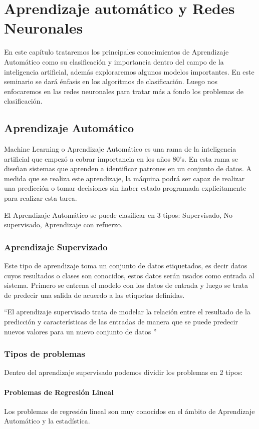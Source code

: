 \chapter{Aprendizaje automático y Redes Neuronales}

En este capítulo trataremos los principales conocimientos de Aprendizaje Automático como su clasificación y importancia dentro del campo de la inteligencia artificial, además exploraremos algunos modelos importantes. 
En este seminario se dará énfasis en los algoritmos de clasificación. Luego nos enfocaremos en las redes neuronales para tratar más a fondo los problemas de clasificación.

\section{Aprendizaje Automático}
Machine Learning o Aprendizaje Automático es una rama de la inteligencia artificial que empezó a cobrar importancia en los años 80's. En esta rama se diseñan sistemas que aprenden a identificar patrones en un conjunto de datos. A medida que se realiza este aprendizaje, la máquina podrá ser capaz de realizar una predicción o tomar decisiones sin haber estado programada explícitamente para realizar esta tarea.


El Aprendizaje Automático se puede clasificar en 3 tipos: Supervisado, No supervisado, Aprendizaje con refuerzo.\cite{WEBSITE:2}
\subsection{Aprendizaje Supervizado}
Este tipo de aprendizaje  toma un conjunto de datos etiquetados, es decir datos cuyos resultados o clases son conocidos, estos datos serán usados como entrada al sistema. Primero se entrena el modelo con los datos de entrada y luego se trata de predecir  una salida de acuerdo a las etiquetas definidas.

 \textquotedblleft El aprendizaje supervisado trata de modelar la relación entre el resultado de la predicción y características de las entradas de manera que se puede predecir nuevos valores para un nuevo conjunto de datos \textquotedblright \cite{WEBSITE:1}
\subsection*{Tipos de problemas}
Dentro del aprendizaje supervisado podemos dividir los problemas en 2 tipos:
\subsubsection*{Problemas de Regresión Lineal}
Los problemas de regresión lineal son muy conocidos en el ámbito de Aprendizaje Automático y la estadística.
